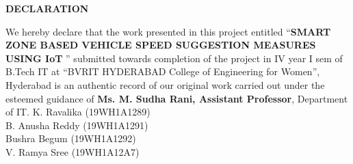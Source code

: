 \documentclass[a4paper,12pt, English]{article}
\newcommand\tab[1][1cm]{\hspace*{#1}}
\begin{document}
\begin{titlepage}
\newcommand{\CC}{C\nolinebreak\hspace{-.05em}\raisebox{.4ex}{\tiny\bf +}\nolinebreak\hspace{-.10em}\raisebox{.4ex}{\tiny\bf +}}
\def\CC{{C\nolinebreak[4]\hspace{-.05em}\raisebox{.4ex}{\tiny\bf ++}}}
\begin{center}
    \textbf{\large DECLARATION}\\
\end{center}
\vspace*{0.2in}

We hereby declare that the work presented in this project entitled “{\textbf{SMART ZONE BASED VEHICLE SPEED SUGGESTION MEASURES
USING IoT
}} ” submitted towards completion of the project in IV year I sem of B.Tech IT at “BVRIT HYDERABAD College of Engineering for Women”, Hyderabad is an authentic record of our original work carried out under the esteemed guidance of {\textbf{ Ms. M. Sudha Rani, Assistant Professor}}, Department of IT.
\newline
\newline
\newline
\newline
\tab\tab\tab\tab \hspace*{6.0cm}
 {{K. Ravalika  (19WH1A1289)\\
 \newline
\newline
 \tab\tab\tab\tab \hspace*{6.0cm}
 B. Anusha Reddy (19WH1A1291) \\
 \newline
\newline
\tab\tab\tab\tab \hspace*{6.0cm}
 Bushra Begum (19WH1A1292) \\
 \newline
\newline
\tab\tab\tab\tab\hspace*{5.96cm}
V. Ramya Sree (19WH1A12A7) }} \\



\end{titlepage}
\end{document}
